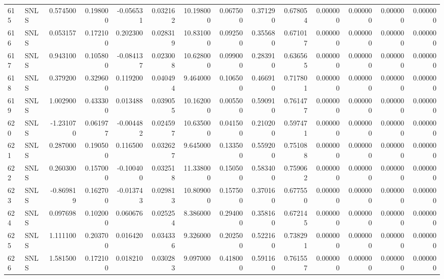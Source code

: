 \begin{tabular}{llrrrrrrrrrrrr}
615 &   SNLS &  0.574500 &      0.198000 & -0.056531 &    0.032162 &  10.198000 &      0.067500 &   0.371290 &  0.678054 &  0.000000 &   0.000000 &     0.000000 &     0.000000 \\
616 &   SNLS &  0.053157 &      0.172100 &  0.202300 &    0.028319 &  10.831000 &      0.092500 &   0.355680 &  0.671017 &  0.000000 &   0.000000 &     0.000000 &     0.000000 \\
617 &   SNLS &  0.943100 &      0.105800 & -0.084137 &    0.023008 &  10.628000 &      0.099000 &   0.283910 &  0.636565 &  0.000000 &   0.000000 &     0.000000 &     0.000000 \\
618 &   SNLS &  0.379200 &      0.329600 &  0.119200 &    0.040494 &   9.464000 &      0.106500 &   0.466910 &  0.717801 &  0.000000 &   0.000000 &     0.000000 &     0.000000 \\
619 &   SNLS &  1.002900 &      0.433300 &  0.013488 &    0.039055 &  10.162000 &      0.005500 &   0.590910 &  0.761477 &  0.000000 &   0.000000 &     0.000000 &     0.000000 \\
620 &   SNLS & -1.231070 &      0.061977 & -0.004482 &    0.024597 &  10.635000 &      0.041500 &   0.210200 &  0.597471 &  0.000000 &   0.000000 &     0.000000 &     0.000000 \\
621 &   SNLS &  0.287000 &      0.190500 &  0.116500 &    0.032627 &   9.645000 &      0.133500 &   0.559200 &  0.751088 &  0.000000 &   0.000000 &     0.000000 &     0.000000 \\
622 &   SNLS &  0.260300 &      0.157000 & -0.100400 &    0.032518 &  11.338000 &      0.150500 &   0.583400 &  0.759062 &  0.000000 &   0.000000 &     0.000000 &     0.000000 \\
623 &   SNLS & -0.869819 &      0.162700 & -0.013743 &    0.029813 &  10.809000 &      0.157500 &   0.370160 &  0.677550 &  0.000000 &   0.000000 &     0.000000 &     0.000000 \\
624 &   SNLS &  0.097698 &      0.102000 &  0.060676 &    0.025254 &   8.386000 &      0.294000 &   0.358160 &  0.672145 &  0.000000 &   0.000000 &     0.000000 &     0.000000 \\
625 &   SNLS &  1.111100 &      0.203700 &  0.016420 &    0.034336 &   9.326000 &      0.202500 &   0.522160 &  0.738291 &  0.000000 &   0.000000 &     0.000000 &     0.000000 \\
626 &   SNLS &  1.581500 &      0.172100 &  0.018210 &    0.030283 &   9.097000 &      0.418000 &   0.591160 &  0.761557 &  0.000000 &   0.000000 &     0.000000 &     0.000000 \\

\end{tabular}
